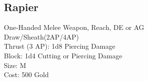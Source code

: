 \subsection{Rapier}\label{weapon:rapier}
One-Handed Melee Weapon,  Reach, DE or AG\\
Draw/Sheath(2AP/4AP)\\
Thrust (3 AP): 1d8 Piercing Damage\\
Block: 1d4 Cutting or Piercing Damage\\
Size: M\\
Cost: 500 Gold\\